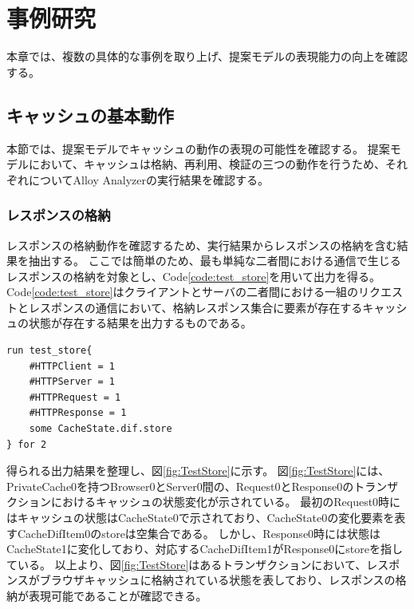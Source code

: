 \documentclass[12pt,a4paper]{jbook}
\begin{document}
\newpage

\chapter{事例研究}
本章では、複数の具体的な事例を取り上げ、提案モデルの表現能力の向上を確認する。

\section{キャッシュの基本動作}
本節では、提案モデルでキャッシュの動作の表現の可能性を確認する。
提案モデルにおいて、キャッシュは格納、再利用、検証の三つの動作を行うため、それぞれについてAlloy Analyzerの実行結果を確認する。

\subsection{レスポンスの格納}
レスポンスの格納動作を確認するため、実行結果からレスポンスの格納を含む結果を抽出する。
ここでは簡単のため、最も単純な二者間における通信で生じるレスポンスの格納を対象とし、Code\ref{code:test_store}を用いて出力を得る。
Code\ref{code:test_store}はクライアントとサーバの二者間における一組のリクエストとレスポンスの通信において、格納レスポンス集合に要素が存在するキャッシュの状態が存在する結果を出力するものである。

\begin{lstlisting}[caption=レスポンスの格納, label=code:test_store]
run test_store{
	#HTTPClient = 1
	#HTTPServer = 1
	#HTTPRequest = 1
	#HTTPResponse = 1
	some CacheState.dif.store
} for 2
\end{lstlisting}

得られる出力結果を整理し、図\ref{fig:TestStore}に示す。
図\ref{fig:TestStore}には、PrivateCache0を持つBrowser0とServer0間の、Request0とResponse0のトランザクションにおけるキャッシュの状態変化が示されている。
最初のRequest0時にはキャッシュの状態はCacheState0で示されており、CacheState0の変化要素を表すCacheDifItem0のstoreは空集合である。
しかし、Response0時には状態はCacheState1に変化しており、対応するCacheDifItem1がResponse0にstoreを指している。
以上より、図\ref{fig:TestStore}はあるトランザクションにおいて、レスポンスがブラウザキャッシュに格納されている状態を表しており、レスポンスの格納が表現可能であることが確認できる。
\end{document}
